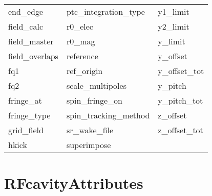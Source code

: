 \begin{tabular}{lll}
end_edge                    & ptc_integration_type        & y1_limit                    \\
field_calc                  & r0_elec                     & y2_limit                    \\
field_master                & r0_mag                      & y_limit                     \\
field_overlaps              & reference                   & y_offset                    \\
fq1                         & ref_origin                  & y_offset_tot                \\
fq2                         & scale_multipoles            & y_pitch                     \\
fringe_at                   & spin_fringe_on              & y_pitch_tot                 \\
fringe_type                 & spin_tracking_method        & z_offset                    \\
grid_field                  & sr_wake_file                & z_offset_tot                \\
hkick                       & superimpose                 &                             \\
 \bottomrule
 \end{tabular}
 \vfill
 
 \section{RFcavityAttributes}
 \label{s:list.rfcavity}
 
